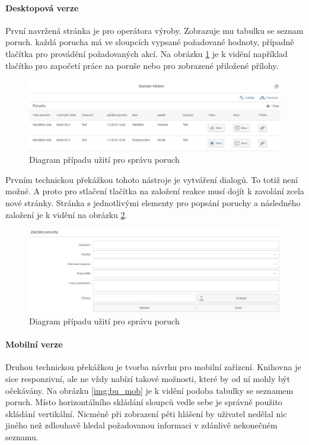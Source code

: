 \documentclass[thesis=M,czech]{FITthesis}[2012/06/26]
\begin{document}
\paragraph{Desktopová verze}
První navržená stránka je pro operátora výroby. Zobrazuje mu tabulku se seznam poruch. každá porucha má ve sloupcích vypsané požadované hodnoty, případně tlačítka pro provádění požadovaných akcí. Na obrázku \ref{img:bu_poruchy_seznam} je k vidění například tlačítko pro započetí práce na poruše nebo pro zobrazené přiložené přílohy. 
\begin{figure}[H]
	\centering
	\includegraphics[width=1\textwidth]{images/bu_poruchy_seznam}
	\caption{Diagram případu užití pro správu poruch}
	\label{img:bu_poruchy_seznam}
\end{figure}
Prvním technickou překážkou tohoto nástroje je vytváření dialogů. To totiž není možné. A proto pro stlačení tlačítka na založení reakce musí dojít k zavolání zcela nové stránky. Stránka s jednotlivými elementy pro popsání poruchy a následného založení je k vidění na obrázku \ref{img:bu_zalozeni_poruchy}. 
\begin{figure}[H]
	\centering
	\includegraphics[width=1\textwidth]{images/bu_zalozeni_poruchy}
	\caption{Diagram případu užití pro správu poruch}
	\label{img:bu_zalozeni_poruchy}
\end{figure}

\paragraph{Mobilní verze}
Druhou technickou překážkou je tvorba návrhu pro mobilní zařízení. Knihovna  je sice responzivní, ale ne vždy nabízí takové možnosti, které by od ní mohly být očekávány. Na obrázku \ref{img:bu_mob} je k vidění podoba tabulky se seznamem poruch. Místo horizontálního skládání sloupců vedle sebe je správně použito skládání vertikální. Nicméně při zobrazení pěti hlášení by uživatel nedělal nic jiného než zdlouhavě hledal požadovanou informaci v zdánlivě nekonečném seznamu.
\end{document}
